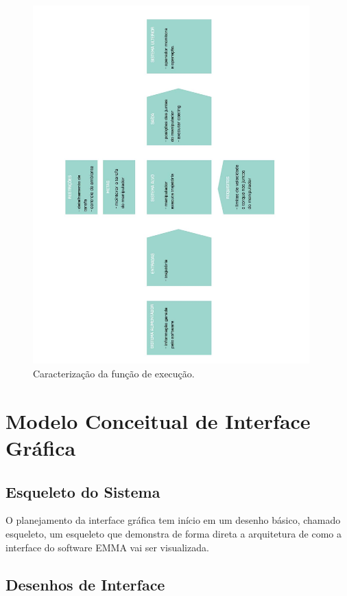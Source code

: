 \documentclass[12pt,a4paper]{article}
\begin{document}
\begin{figure}[H]
\begin{center}
  \includegraphics[width=0.95\textwidth]{figs/caracterizacao_execucao.jpg}
  \caption{Caracterização da função de execução.}
  \label{fig:caracterização execução}
\end{center}
\end{figure} 


\section {Modelo Conceitual de Interface Gráfica}

\subsection {Esqueleto do Sistema}
O planejamento da interface gráfica tem início em um desenho básico, chamado
esqueleto, um esqueleto que demonstra de forma direta a arquitetura de como a
interface do software EMMA vai ser visualizada.

\subsection {Desenhos de Interface}
\end{document}

